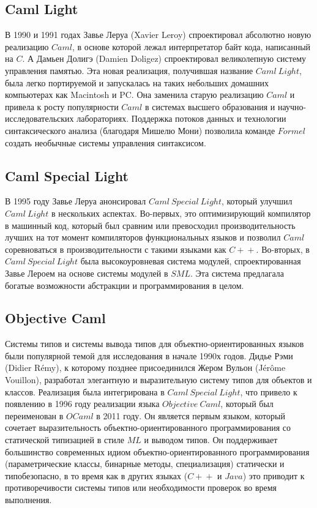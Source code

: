 \documentclass[14pt]{matmex-diploma-custom}
\begin{document}
\subsection{Caml Light}
В 1990 и 1991 годах Завье Леруа (Xavier Leroy) спроектировал абсолютно новую реализацию $Caml$, в основе которой лежал интерпретатор байт кода, написанный на $C$. А Дамьен Долигэ (Damien Doligez) спроектировал великолепную систему управления памятью. Эта новая реализация, получившая название $Caml\ Light$, была легко портируемой и запускалась на таких небольших домашних компьютерах как Macintosh и PC. Она заменила старую реализацию $Caml$ и привела к росту популярности $Caml$ в системах высшего образования и научно-исследовательских лабораториях. Поддержка потоков данных и технологии синтаксического анализа (благодаря Мишелю Мони) позволила команде $Formel$ создать необычные системы управления синтаксисом. 

\subsection{Caml Special Light}
В 1995 году Завье Леруа анонсировал $Caml\ Special\ Light$, который улучшил $Caml\ Light$ в нескольких аспектах. Во-первых, это оптимизирующий компилятор в машинный код, который был сравним или превосходил производительность лучших на тот момент компиляторов функциональных языков и позволил $Caml$ соревноваться в производительности с  такими языками как $C\!+\!+$. Во-вторых, в $Caml\ Special\ Light$ была высокоуровневая система модулей, спроектированная Завье Лероем на основе системы модулей в $S\!M\!L$. Эта система предлагала богатые возможности абстракции и программирования в целом. 

\subsection{Objective Caml}
Системы типов и системы вывода типов для объектно-ориентированных языков были популярной темой для исследования в начале 1990х годов. Дидье Рэми (Didier Rémy), к которому позднее присоединился Жером Вульон (Jérôme Vouillon), разработал элегантную и выразительную систему типов для объектов и классов. Реализация была интегрирована в 
$Caml\ Special\ Light$, что привело к появлению в 1996 году реализации языка $Objective\ Caml$, который был переименован в $OCaml$ в 2011 году. Он является первым языком, который сочетает выразительность объектно-ориентированного программирования со статической типизацией в стиле $M\!L$ и выводом типов.  Он поддерживает большинство современных идиом объектно-ориентированного программирования (параметрические классы, бинарные методы, специализация) статически и типобезопасно, в то время как в других языках ($C\!+\!+$ и $Java$) это приводит к противоречивости системы типов или необходимости проверок во время выполнения.
\end{document}

